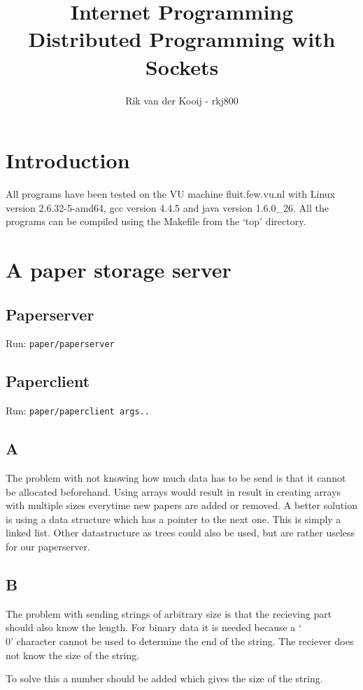 \documentclass[10pt,a4paper]{article}
\title{Internet Programming\\Distributed Programming with Sockets}
\author{Rik van der Kooij - rkj800}
\begin{document}
\maketitle

\section{Introduction}
All programs have been tested on the VU machine fluit.few.vu.nl with Linux version 2.6.32-5-amd64, gcc version 4.4.5 and java version 1.6.0\_26. All the programs can be compiled using the Makefile from the `top' directory.


\section{A paper storage server}
\subsection{Paperserver}
Run: \texttt{paper/paperserver}

\subsection{Paperclient}
Run: \texttt{paper/paperclient args..}

\subsection{A}
The problem with not knowing how much data has to be send is that it cannot be allocated beforehand. Using arrays would result in result in creating arrays with multiple sizes everytime new papers are added or removed. A better solution is using a data structure which has a pointer to the next one. This is simply a linked list. Other datastructure as trees could also be used, but are rather useless for our paperserver.

\subsection{B}
The problem with sending strings of arbitrary size is that the recieving part should also know the length. For binary data it is needed because a `\\0' character cannot be used to determine the end of the string. The reciever does not know the size of the string.

To solve this a number should be added which gives the size of the string.
\end{document}

